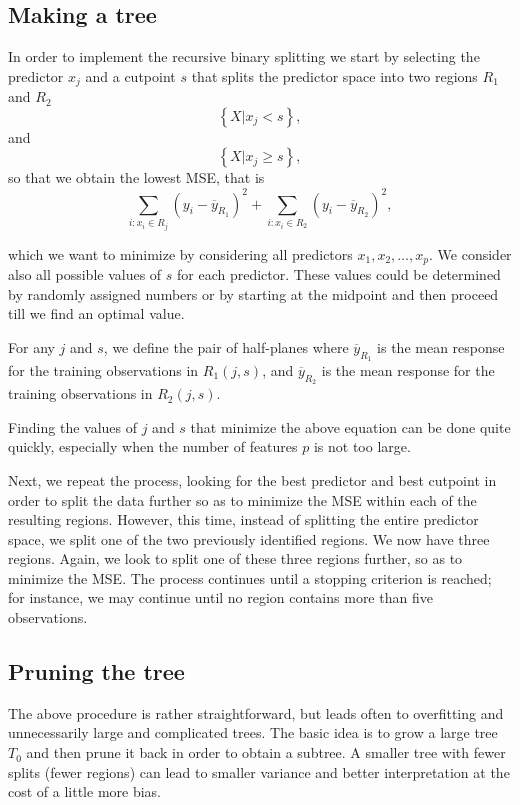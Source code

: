 \documentclass[%
oneside,                 %
final,                   %
10pt]{article}
\begin{document}
\subsection{Making a tree}

In order to implement the recursive binary splitting we start by selecting
the predictor $x_j$ and a cutpoint $s$ that splits the predictor space into two regions $R_1$ and $R_2$
\[
\left\{X\vert x_j < s\right\},
\]
and
\[
\left\{X\vert x_j \geq s\right\},
\]
so that we obtain the lowest MSE, that is
\[
\sum_{i:x_i\in R_j}(y_i-\overline{y}_{R_1})^2+\sum_{i:x_i\in R_2}(y_i-\overline{y}_{R_2})^2,
\]

which we want to minimize by considering all predictors
$x_1,x_2,\dots,x_p$.  We consider also all possible values of $s$ for
each predictor. These values could be determined by randomly assigned
numbers or by starting at the midpoint and then proceed till we find
an optimal value.

For any $j$ and $s$, we define the pair of half-planes where
$\overline{y}_{R_1}$ is the mean response for the training
observations in $R_1(j,s)$, and $\overline{y}_{R_2}$ is the mean
response for the training observations in $R_2(j,s)$.

Finding the values of $j$ and $s$ that minimize the above equation can be
done quite quickly, especially when the number of features $p$ is not
too large.

Next, we repeat the process, looking
for the best predictor and best cutpoint in order to split the data
further so as to minimize the MSE within each of the resulting
regions. However, this time, instead of splitting the entire predictor
space, we split one of the two previously identified regions. We now
have three regions. Again, we look to split one of these three regions
further, so as to minimize the MSE. The process continues until a
stopping criterion is reached; for instance, we may continue until no
region contains more than five observations.

\subsection{Pruning the tree}

The above procedure is rather straightforward, but leads often to
overfitting and unnecessarily large and complicated trees. The basic
idea is to grow a large tree $T_0$ and then prune it back in order to
obtain a subtree. A smaller tree with fewer splits (fewer regions) can
lead to smaller variance and better interpretation at the cost of a
little more bias.
\end{document}
